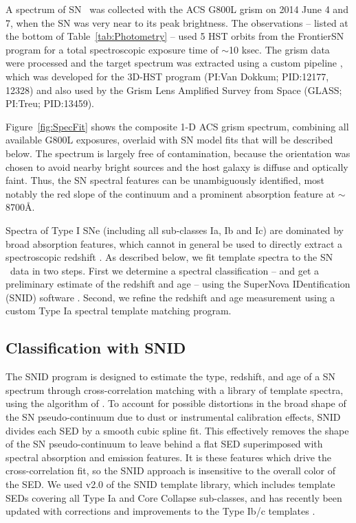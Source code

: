 A spectrum of SN \tomas\ was collected with the ACS G800L grism on
2014 June 4 and 7, when the SN was very near to its peak brightness.
The observations -- listed at the bottom of Table~\ref{tab:Photometry}
-- used 5 HST orbits from the FrontierSN program for a total
spectroscopic exposure time of $\sim$10 ksec.  The grism data were
processed and the target spectrum was extracted using a custom
pipeline \citep{Brammer:2012}, which was developed for the 3D-HST
program (PI:Van Dokkum; PID:12177, 12328) and also used by the Grism
Lens Amplified Survey from Space (GLASS; PI:Treu; PID:13459).

Figure~\ref{fig:SpecFit} shows the composite 1-D ACS grism spectrum,
combining all available G800L exposures, overlaid with SN model fits
that will be described below.  The spectrum is largely free of
contamination, because the orientation was chosen to avoid nearby
bright sources and the host galaxy is diffuse and optically faint.
Thus, the SN spectral features can be unambiguously identified, most
notably the red slope of the continuum and a prominent absorption
feature at $\sim$8700\AA.  


Spectra of Type I SNe (including all sub-classes Ia, Ib and Ic) are
dominated by broad absorption features, which cannot in general be
used to directly extract a spectroscopic redshift \citep[see
e.g.][]{Filippenko:1997}.  As described below, we fit template spectra
to the SN \tomas\ data in two steps.  First we determine a spectral
classification -- and get a preliminary estimate of the redshift and
age -- using the SuperNova IDentification (SNID)
software \citep{Blondin:2007}.  Second, we refine the redshift and age
measurement using a custom Type Ia spectral template matching program.

\subsection{Classification with SNID}
\label{sec:SNID}

The SNID program is designed to estimate the type, redshift, and age
of a SN spectrum through cross-correlation matching with a library of
template spectra, using the algorithm of \citet{Tonry:1979}.
To account for possible distortions in the broad shape of the SN
pseudo-continuum due to dust or instrumental calibration effects, SNID
divides each SED by a smooth cubic spline fit. This effectively
removes the shape of the SN pseudo-continuum to leave behind a flat
SED superimposed with spectral absorption and emission features.  It
is these features which drive the cross-correlation fit, so the SNID
approach is insensitive to the overall color of the SED.  We used v2.0
of the SNID template library, which includes template SEDs covering
all Type Ia and Core Collapse sub-classes, and has recently been
updated with corrections and improvements to the Type Ib/c
templates \citep{Liu:2014}.

